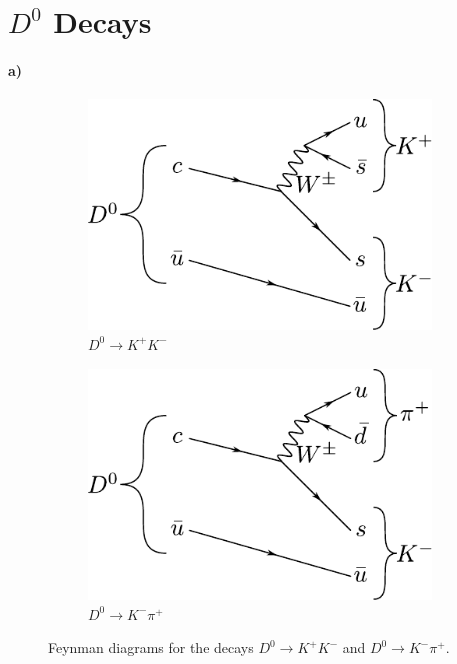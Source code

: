 \section{\texorpdfstring{$D^0$}{d0} Decays}
\paragraph{a)}
\begin{figure}[H]
	\centering
	\begin{subfigure}{0.49\textwidth}
		\includegraphics[width=\textwidth]{figures/D0_K+K-.pdf}
		\caption{$D^0 \to K^+ K^-$}
	\end{subfigure}
	\hfill
	\begin{subfigure}{0.49\textwidth}
		\includegraphics[width=\textwidth]{figures/D0_K-pi+.pdf}
		\caption{$D^0 \to K^- \pi^+$}
	\end{subfigure}
	\caption{Feynman diagrams for the decays $D^0 \to K^+ K^-$ and $D^0 \to K^- \pi^+$.}
\end{figure}

